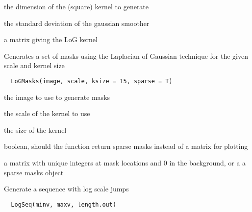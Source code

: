 \documentclass[a4paper]{book}
\begin{document}
%
\begin{Arguments}
\begin{ldescription}
\item[\code{kdim}] the dimension of the (square) kernel to
generate

\item[\code{sigma}] the standard deviation of the gaussian
smoother
\end{ldescription}
\end{Arguments}
%
\begin{Value}
a matrix giving the LoG kernel
\end{Value}
%
\begin{Description}\relax
Generates a set of masks using the Laplacian of Gaussian
technique for the given scale and kernel size
\end{Description}
%
\begin{Usage}
\begin{verbatim}
  LoGMasks(image, scale, ksize = 15, sparse = T)
\end{verbatim}
\end{Usage}
%
\begin{Arguments}
\begin{ldescription}
\item[\code{image}] the image to use to generate masks

\item[\code{scale}] the scale of the kernel to use

\item[\code{kside}] the size of the kernel

\item[\code{sparse}] boolean, should the function return sparse
masks instead of a matrix for plotting
\end{ldescription}
\end{Arguments}
%
\begin{Value}
a matrix with unique integers at mask locations and 0 in
the background, or a a sparse masks object
\end{Value}
%
\begin{Description}\relax
Generate a sequence with log scale jumps
\end{Description}
%
\begin{Usage}
\begin{verbatim}
  LogSeq(minv, maxv, length.out)
\end{verbatim}
\end{Usage}
\end{document}
